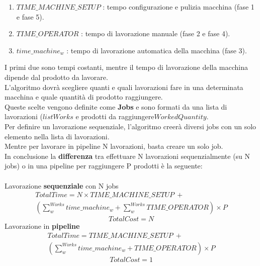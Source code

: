 \begin{enumerate}
    \item \(TIME\_MACHINE\_SETUP\) : tempo configurazione e pulizia macchina (fase 1 e fase 5).
    \item \(TIME\_OPERATOR\) : tempo di lavorazione manuale (fase 2 e fase 4).
    \item \(time\_machine_w\) : tempo di lavorazione automatica della macchina (fase 3).
\end{enumerate}
I primi due sono tempi costanti, mentre il tempo di lavorazione della macchina dipende dal prodotto da lavorare.\\
L'algoritmo dovrà scegliere quanti e quali lavorazioni fare in una determinata macchina e quale quantità di prodotto raggiungere.\\
Queste scelte vengono definite come \textbf{Jobs} e sono formati da una lista di lavorazioni (\(listWorks\) e prodotti da raggiungere\(WorkedQuantity\).\\
Per definire un lavorazione sequenziale, l'algoritmo creerà diversi jobs con un solo elemento nella lista di lavorazioni.\\
Mentre per lavorare in pipeline N lavorazioni, basta creare un solo job.\\
In conclusione la \textbf{differenza} tra effettuare N lavorazioni sequenzialmente (su N jobs) o in una pipeline per raggiungere P prodotti è la seguente:\\ \\
Lavorazione \textbf{sequenziale} con N jobs\\ 
\begin{multline} \label{eq:TotalTimeSeq}
TotalTime = N \times TIME\_MACHINE\_SETUP \ + \\
\left( \sum_{w}^{Works} time\_machine_w + \sum_{w}^{Works} TIME\_OPERATOR \right) \times P  
\end{multline}
\begin{equation} \label{eq:TotalCostSeq}
    TotalCost = N
\end{equation}
Lavorazione in \textbf{pipeline}\\ 
\begin{multline} \label{eq:TotalTimePipeline}
    TotalTime = TIME\_MACHINE\_SETUP \ + \\
    \left( \sum_{w}^{Works} time\_machine_w + TIME\_OPERATOR \right) \times P
\end{multline}
\begin{equation} \label{eq:TotalCostPipeline}
    TotalCost = 1
\end{equation}



